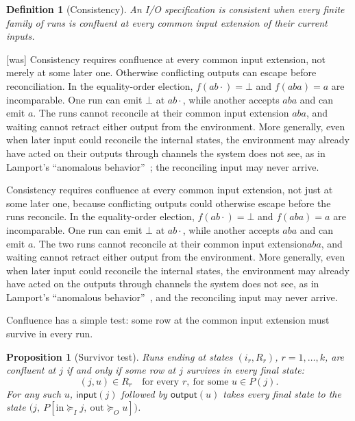 \documentclass[sigconf]{cidr-2027}
\newtheorem{proposition}{Proposition}
\newtheorem{definition}{Definition}
\theoremstyle{remark}
\newcommand{\InputGe}{\succeq_I}
\newcommand{\OutputGe}{\succeq_O}
\newcommand{\indesc}{input extension\xspace} %
\newcommand{\spectype}[1][]{I/O specification#1\xspace}
\newcommand{\fiber}[1]{P(#1)}
\begin{document}
\begin{definition}[Consistency]
\label{def:consistency}
An \spectype is \emph{consistent} when every finite family of
runs is confluent at every common \indesc of their current inputs.
\end{definition}



{\footnotesize\color{black!50}\noindent\textsf{[was]} Consistency requires confluence at every common \indesc, not merely at some
later one.  Otherwise conflicting outputs can escape before reconciliation.
In the equality-order election, $f(ab\cdot)=\bot$ and $f(aba)=a$ are
incomparable.  One run can emit $\bot$ at $ab\cdot$, while another accepts
$aba$ and can emit $a$.  The runs cannot reconcile at their common \indesc
$aba$, and waiting cannot retract either output from the environment.  More
generally, even when later input could reconcile the internal states, the
environment may already have acted on their outputs through channels the system
does not see, as in Lamport's ``anomalous behavior''~\cite{lamport1978time};
the reconciling input may never arrive.\par}

\color{blue!70!black}Consistency requires confluence at every common \indesc, not just at some
later one, because conflicting outputs could otherwise escape before the runs
reconcile.
In the equality-order election, $f(ab\cdot)=\bot$ and $f(aba)=a$ are
incomparable.  One run can emit $\bot$ at $ab\cdot$, while another accepts
$aba$ and can emit $a$.  The two runs cannot reconcile at their common \indesc $aba$, and waiting cannot
retract either output from the environment.  More generally, even when later
input could reconcile the internal states, the environment may already have
acted on the outputs through channels the system does not see, as in Lamport's
``anomalous behavior''~\cite{lamport1978time}, and the reconciling input may
never arrive.\color{black}

Confluence has a simple test: some row at the common \indesc must survive
in every run.

\begin{proposition}[Survivor test]
\label{prop:confluence}
Runs ending at states $(i_r,R_r)$, $r=1,\ldots,k$, are confluent
at $j$ if and only if some row at $j$ survives in every final state:
\begin{equation}
  (j,u)\in R_r\quad\text{for every }r,\ \text{for some }u\in\fiber{j}.
  \label{eq:reconciliation}
\end{equation}
For any such $u$, $\mathsf{input}(j)$ followed by $\mathsf{output}(u)$ takes
every final state to the state
$\bigl(j,\ P[\mathrm{in}\InputGe j,\ \mathrm{out}\OutputGe u]\bigr)$.
\end{proposition}
\end{document}

